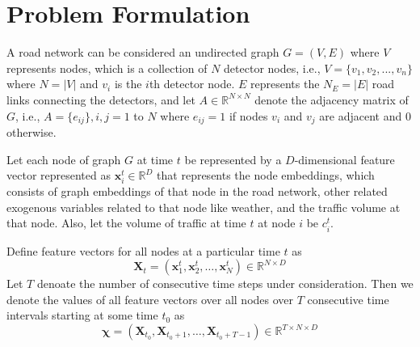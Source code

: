 \section{Problem Formulation}\label{sec:problem-for}

A road network can be considered an undirected graph $G = (V, E)$ where $V$ represents nodes, which is a collection of $N$ detector nodes, i.e., $V=\{v_1,v_2,...,v_n\}$ where $N = |V|$ and $v_i$ is the $i$th detector node. $E$ represents the $N_E = |E|$ road links connecting the detectors, and let $A \in \mathbb{R}^{N \times N}$ denote the adjacency matrix of $G$, i.e., $A = \{e_{ij}\}, i,j=1$ to $N$ where $e_{ij} = 1$ if nodes $v_i$ and $v_j$ are adjacent and $0$ otherwise.

Let each node of graph $G$ at time $t$ be represented by a $D$-dimensional feature vector represented as $\mathbf{x}_i^t \in \mathbb{R}^D$ that represents the node embeddings, which consists of graph embeddings of that node in the road network, other related exogenous variables related to that node like weather, and the traffic volume at that node. Also, let the volume of traffic at time $t$ at node $i$ be $c_i^t$.

Define feature vectors for all nodes at a particular time $t$ as
\begin{equation}
    \mathbf{X}_t = (\mathbf{x}_1^t, \mathbf{x}_2^t, \ldots, \mathbf{x}_N^t) \in \mathbb{R}^{N \times D} \label{eq:X}
\end{equation}
Let $T$ denoate the number of consecutive time steps under consideration. Then we denote the values of all feature vectors over all nodes over $T$ consecutive time intervals starting at some time $t_0$ as
\begin{equation}
    \bm{\chi} = (\mathbf{X}_{t_0}, \mathbf{X}_{t_0+1}, \ldots, \mathbf{X}_{t_0+T-1}) \in \mathbb{R}^{T \times N \times D} \label{eq:chi}
\end{equation}

